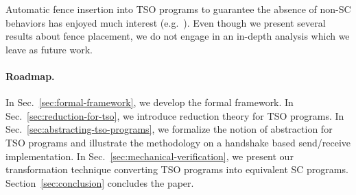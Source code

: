 \documentclass[preprint,9pt]{sigplanconf}
\begin{document}
Automatic fence insertion into TSO programs to guarantee the absence of non-SC behaviors has enjoyed much interest (e.g.~\cite{AAC+2012,AAC+2013,BAM2007,FLM2003,LNP+2012,MVY2014,VN2011}).
Even though we present several results about fence placement, we do not engage in an in-depth analysis which we leave as future work.



\paragraph{Roadmap.}
In Sec.~\ref{sec:formal-framework}, we develop the formal framework.
In Sec.~\ref{sec:reduction-for-tso}, we introduce reduction theory for TSO programs.
In Sec.~\ref{sec:abstracting-tso-programs}, we formalize the notion of abstraction for TSO programs and illustrate the methodology on a handshake based send/receive implementation.
In Sec.~\ref{sec:mechanical-verification}, we present our transformation technique converting TSO programs into equivalent SC programs.
Section~\ref{sec:conclusion} concludes the paper.




\newtheorem{definition}{Definition}
\newtheorem{proposition}{Proposition}
\newtheorem{lemma}{Lemma}
\newtheorem{corollary}{Corollary}
\newtheorem{theorem}{Theorem}

\end{document}
